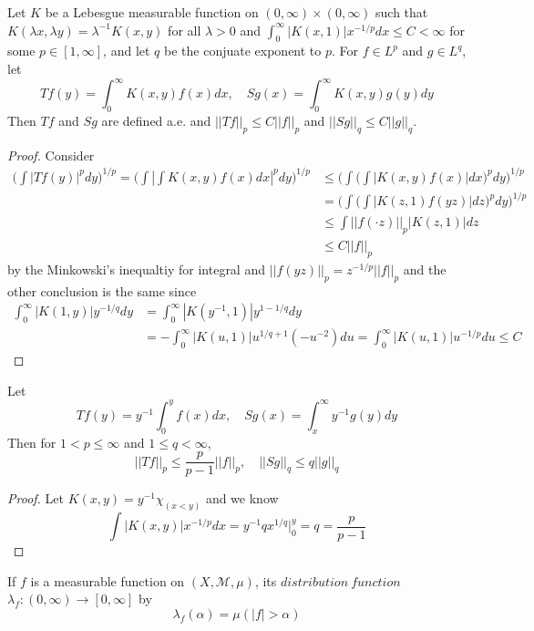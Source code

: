 \documentclass[lang=en, color=blue, ]{elegantbook}
\newcommand{\M}{\mathcal{M}}
\begin{document}
\begin{theorem}
    Let $K$ be a Lebesgue measurable function on $(0,\infty)\times(0,\infty)$ such that $K(\lambda x,\lambda y) = \lambda^{-1}K(x,y)$ for all $\lambda > 0$ and $\int_0^{\infty}|K(x,1)|x^{-1/p}dx \leq C < \infty$ for some $p\in[1,\infty]$, and let $q$ be the conjuate exponent to $p$. For $f\in L^p$ and $g\in L^q$, let
    \[
    Tf(y) = \int_0^{\infty} K(x,y)f(x)dx,\quad Sg(x) = \int_0^{\infty} K(x,y)g(y)dy
    \]
    Then $Tf$ and $Sg$ are defined a.e. and $||Tf||_p \leq C||f||_p$ and $||Sg||_q \leq C||g||_q$.
\end{theorem}
\begin{proof}
    Consider
    \[
    \begin{aligned}
    \Big(\int |Tf(y)|^p dy\Big)^{1/p} = \Big(\int |\int K(x,y)f(x) dx|^p dy\big)^{1/p}
     &\leq \Big(\int \Big(\int |K(x,y)f(x)| dx\Big)^p dy\Big)^{1/p} \\
    &= \Big(\int \Big(\int |K(z,1)f(yz)| dz\Big)^p dy \Big)^{1/p}\\
    &\leq \int ||f(\cdot z)||_p |K(z,1)| dz \\
    &\leq C||f||_p
    \end{aligned}
    \]
    by the Minkowski's inequaltiy for integral and $||f(yz)||_p = z^{-1/p}||f||_p$ and the other conclusion is the same since
    \[
    \begin{aligned}
    \int_0^{\infty} |K(1,y)|y^{-1/q} dy &= \int_0^{\infty} |K(y^{-1},1)|y^{1-1/q}dy \\ &= - \int_0^{\infty}|K(u,1)|u^{1/q+1}(-u^{-2}) du = \int_0^{\infty} |K(u,1)| u^{-1/p} du \leq C
    \end{aligned}
    \]
\end{proof}

\begin{corollary}
    Let
    \[Tf(y) = y^{-1}\int_0^y f(x)dx,\quad Sg(x) = \int_x^{\infty} y^{-1}g(y)dy\]
    Then for $1<p\leq \infty$ and $1\leq q <\infty$,
    \[||Tf||_p \leq \dfrac{p}{p-1}||f||_p, \quad ||Sg||_q \leq q||g||_q\]
\end{corollary}
\begin{proof}\par
    Let $K(x,y) = y^{-1}\chi_{(x<y)}$ and we know
    \[\int |K(x,y)|x^{-1/p} dx = y^{-1} qx^{1/q}|^y_0 = q = \dfrac{p}{p-1}\]
\end{proof}

\begin{definition}
    If $f$ is a measurable function on $(X,\M,\mu)$, its $distribution\ function$ $\lambda_f:(0,\infty)\to[0,\infty]$ by
    \[\lambda_f(\alpha) = \mu(|f|>\alpha)\]
\end{definition}
\end{document}
